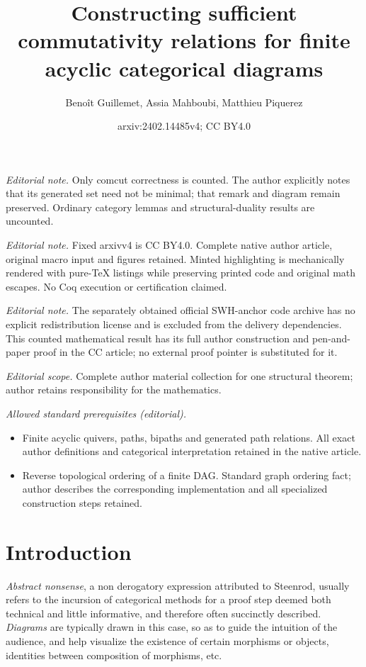 \documentclass[10pt,a4paper]{article}
\title{Constructing sufficient commutativity relations for finite acyclic categorical diagrams}
\author{Benoît Guillemet, Assia Mahboubi, Matthieu Piquerez}
\date{arxiv:2402.14485v4; CC BY4.0}
\renewcommand{\~}{\widetilde}
\begin{document}
\maketitle
\noindent\textit{Editorial note.} Only comcut correctness is counted. The author explicitly notes that its generated set need not be minimal; that remark and diagram remain preserved. Ordinary category lemmas and structural-duality results are uncounted.\par\medskip
\noindent\textit{Editorial note.} Fixed arxivv4 is CC BY4.0. Complete native author article, original macro input and figures retained. Minted highlighting is mechanically rendered with pure-TeX listings while preserving printed code and original math escapes. No Coq execution or certification claimed.\par\medskip
\noindent\textit{Editorial note.} The separately obtained official SWH-anchor code archive has no explicit redistribution license and is excluded from the delivery dependencies. This counted mathematical result has its full author construction and pen-and-paper proof in the CC article; no external proof pointer is substituted for it.\par\medskip
\noindent\textit{Editorial scope.} Complete author material collection for one structural theorem; author retains responsibility for the mathematics.\par\medskip
\noindent\textit{Allowed standard prerequisites (editorial).}\begin{itemize}
\item Finite acyclic quivers, paths, bipaths and generated path relations. All exact author definitions and categorical interpretation retained in the native article.
\item Reverse topological ordering of a finite DAG. Standard graph ordering fact; author describes the corresponding implementation and all specialized construction steps retained.
\end{itemize}\medskip
\section{Introduction}\label{sec:intro}

\emph{Abstract nonsense}, a non derogatory expression attributed to Steenrod, usually refers to the incursion of categorical methods for a proof step deemed both technical and little informative, and therefore often succinctly described. \emph{Diagrams} are typically drawn in this case, so as to guide the intuition of the audience, and help visualize the existence of certain morphisms or objects, identities between composition of morphisms, etc.
\end{document}
